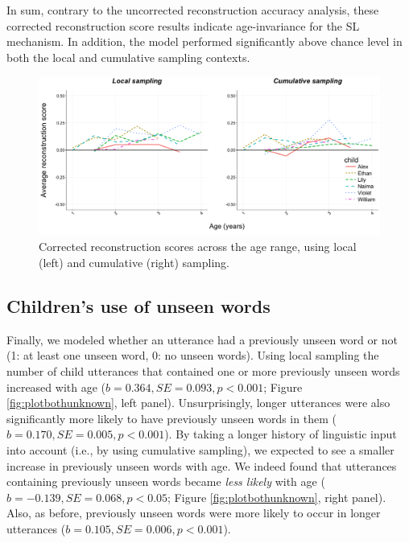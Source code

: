 \documentclass{article}
\begin{document}
In sum, contrary to the uncorrected reconstruction accuracy analysis, these corrected reconstruction score results indicate age-invariance for the SL mechanism. In addition, the model performed significantly above chance level in both the local and cumulative sampling contexts.

\begin{figure}
\centering
\includegraphics[width=\textwidth]{images/plotbothreconstruction.png} 
\caption{Corrected reconstruction scores across the age range, using local (left) and cumulative (right) sampling.}
\label{fig:plotbothreconstruction}
\end{figure}

\subsection{Children's use of unseen words}

Finally, we modeled whether an utterance had a previously unseen word or not (1: at least one unseen word, 0: no unseen words). Using local sampling the number of child utterances that contained one or more previously unseen words increased with age ($b = 0.364, SE = 0.093, p < 0.001$; Figure \ref{fig:plotbothunknown}, left panel). Unsurprisingly, longer utterances were also significantly more likely to have previously unseen words in them ($b = 0.170, SE = 0.005, p < 0.001$). By taking a longer history of linguistic input into account (i.e., by using cumulative sampling), we expected to see a smaller increase in previously unseen words with age. We indeed found that utterances containing previously unseen words became \textit{less likely} with age ($b = -0.139, SE = 0.068, p < 0.05$; Figure \ref{fig:plotbothunknown}, right panel). Also, as before, previously unseen words were more likely to occur in longer utterances ($b = 0.105, SE = 0.006, p < 0.001$).
\end{document}
